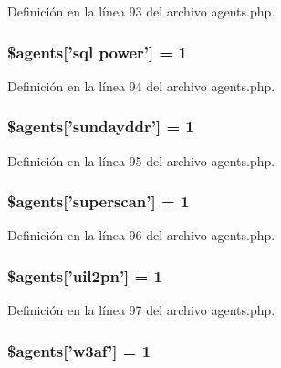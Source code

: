 Definición en la línea 93 del archivo agents.\-php.

\hypertarget{agents_8php_ae7d242e1aa3742a70cb00a1ff4b753b9}{
\subsubsection[{\$agents}]{\setlength{\rightskip}{0pt plus 5cm}\$agents\mbox{[}'sql power'\mbox{]} = 1}}\label{agents_8php_ae7d242e1aa3742a70cb00a1ff4b753b9}


Definición en la línea 94 del archivo agents.\-php.

\hypertarget{agents_8php_a47c2bf8eef71497cac545a01e488fc22}{
\subsubsection[{\$agents}]{\setlength{\rightskip}{0pt plus 5cm}\$agents\mbox{[}'sundayddr'\mbox{]} = 1}}\label{agents_8php_a47c2bf8eef71497cac545a01e488fc22}


Definición en la línea 95 del archivo agents.\-php.

\hypertarget{agents_8php_a59a813d5930a63d34b1f824f7fcc5661}{
\subsubsection[{\$agents}]{\setlength{\rightskip}{0pt plus 5cm}\$agents\mbox{[}'superscan'\mbox{]} = 1}}\label{agents_8php_a59a813d5930a63d34b1f824f7fcc5661}


Definición en la línea 96 del archivo agents.\-php.

\hypertarget{agents_8php_ae0b07ad8389c28d41e2c14d16fdd73d3}{
\subsubsection[{\$agents}]{\setlength{\rightskip}{0pt plus 5cm}\$agents\mbox{[}'uil2pn'\mbox{]} = 1}}\label{agents_8php_ae0b07ad8389c28d41e2c14d16fdd73d3}


Definición en la línea 97 del archivo agents.\-php.

\hypertarget{agents_8php_aa91ec749a378bdf7cffc0114b6a884dc}{
\subsubsection[{\$agents}]{\setlength{\rightskip}{0pt plus 5cm}\$agents\mbox{[}'w3af'\mbox{]} = 1}}\label{agents_8php_aa91ec749a378bdf7cffc0114b6a884dc}


